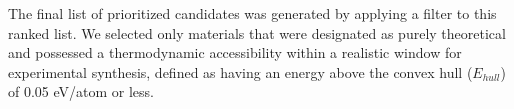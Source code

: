 \documentclass[]{article}
\begin{document}
The final list of prioritized candidates was generated by applying a filter to this ranked list. We selected only materials that were designated as purely theoretical and possessed a thermodynamic accessibility within a realistic window for experimental synthesis, defined as having an energy above the convex hull ($E_{hull}$) of 0.05 eV/atom or less.
\end{document}
